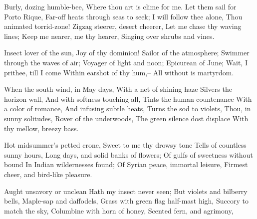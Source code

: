 
\begin{poem}
	\begin{stanza}
			Burly, dozing humble-bee,\verseline
			Where thou art is clime for me.\verseline
			Let them sail for Porto Rique,\verseline
			Far-off heats through seas to seek;\verseline
			I will follow thee alone,\verseline
			Thou animated torrid-zone!\verseline
			Zigzag steerer, desert cheerer,\verseline
			Let me chase thy waving lines;\verseline
			Keep me nearer, me thy hearer,\verseline
			Singing over shrubs and vines.
	\end{stanza}
	\begin{stanza}
			Insect lover of the sun,\verseline
			Joy of thy dominion!\verseline
			Sailor of the atmosphere;\verseline
			Swimmer through the waves of air;\verseline
			Voyager of light and noon;\verseline
			Epicurean of June;\verseline
			Wait, I prithee, till I come\verseline
			Within earshot of thy hum,--\verseline
			All without is martyrdom.
	\end{stanza}
	\begin{stanza}
			When the south wind, in May days,\verseline
			With a net of shining haze\verseline
			Silvers the horizon wall,\verseline
			And with softness touching all,\verseline
			Tints the human countenance\verseline
			With a color of romance,\verseline
			And infusing subtle heats,\verseline
			Turns the sod to violets,\verseline
			Thou, in sunny solitudes,\verseline
			Rover of the underwoods,\verseline
			The green silence dost displace\verseline
			With thy mellow, breezy bass.
	\end{stanza}
	\begin{stanza}
			Hot midsummer's petted crone,\verseline
			Sweet to me thy drowsy tone\verseline
			Tells of countless sunny hours,\verseline
			Long days, and solid banks of flowers;\verseline
			Of gulfs of sweetness without bound\verseline
			In Indian wildernesses found;\verseline
			Of Syrian peace, immortal leisure,\verseline
			Firmest cheer, and bird-like pleasure.
	\end{stanza}
	\begin{stanza}
			Aught unsavory or unclean\verseline
			Hath my insect never seen;\verseline
			But violets and bilberry bells,\verseline
			Maple-sap and daffodels,\verseline
			Grass with green flag half-mast high,\verseline
			Succory to match the sky,\verseline
			Columbine with horn of honey,\verseline
			Scented fern, and agrimony,\verseline

\end{stanza}
\end{poem}
